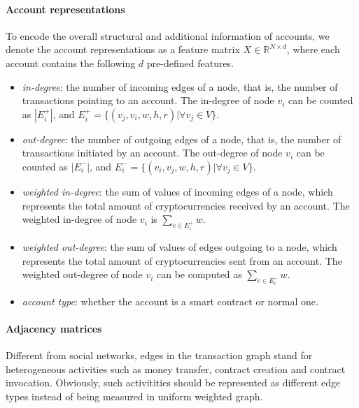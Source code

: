 

\paragraph{Account representations} To encode the overall structural and additional information of accounts, we denote the account representations as a feature matrix $X \in \mathbb{R}^{N \times d}$, where each account contains the following $d$ pre-defined features.

\begin{itemize}
	\item \emph{in-degree}: the number of incoming edges of a node, that is, the number of transactions pointing to an account. The in-degree of node $v_i$ can be counted as $|E_{i}^{+}|$, and $E_{i}^{+}=\{(v_j,v_i,w,h,r)| \forall v_j \in V\}$.
	\item \emph{out-degree}: the number of outgoing edges of a node, that is, the number of transactions initiated by an account. The out-degree of node $v_i$ can be counted as $|E_{i}^{-}|$, and $E_{i}^{-}=\{(v_i,v_j,w,h,r)| \forall v_j \in V\}$.
	\item \emph{weighted in-degree}: the sum of values of incoming edges of a node, which represents the total amount of cryptocurrencies received by an account. The weighted in-degree of node $v_i$ is $\sum_{e\in E_{i}^{+}}w$.
	\item \emph{weighted out-degree}: the sum of values of edges outgoing to a node, which represents the total amount of cryptocurrencies sent from an account. The weighted out-degree of node $v_i$ can be computed as $\sum_{e\in E_{i}^{-}}w$.
	\item \emph{account type}: whether the account is a smart contract or normal one.
\end{itemize}

\paragraph{Adjacency matrices} Different from social networks, edges in the transaction graph stand for heterogeneous activities such as money transfer, contract creation and contract invocation. Obviously, such %
activitities should be represented as different edge types instead of being measured in uniform weighted graph.

